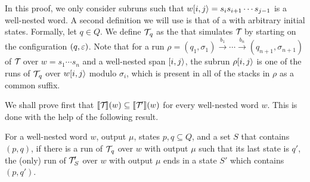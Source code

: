 	In this proof, we only consider subruns such that $w[i,j\rangle = s_{i}s_{i+1}\cdots s_{j-1}$ is a well-nested word. 
	A second definition we will use is that of a \vpann with arbitrary initial states. 
	Formally, let $q\in Q$. 
	We define $\mathcal{T}\!_{q}$ as the \vpann that simulates $\mathcal{T}\!$ by starting on the configuration $(q,\varepsilon)$. 
	Note that for a run $\rho = (q_1, \sigma_1) \xrightarrow{b_1} \cdots  \xrightarrow{b_n} (q_{n+1}, \sigma_{n+1})$ of $\mathcal{T}\!$ over $w = s_1\cdots s_n$ and a well-nested span $[i,j\rangle$, the subrun $\rho[i,j\rangle$ is one of the runs of $\mathcal{T}\!_{q}$ over $w[i,j\rangle$ modulo $\sigma_i$, which is present in all of the stacks in $\rho$ as a common suffix.
	
	We shall prove first that $\llbracket \mathcal{T}\! \rrbracket(w) \subseteq \llbracket \mathcal{T}\!' \rrbracket(w)$ for every well-nested word $w$. This is done with the help of the following result.
	
	\begin{claim}
		For a well-nested word $w$, output $\mu$, states $p,q\subseteq Q$, and a set $S$ that contains $(p,q)$, if there is a run of $\mathcal{T}\!_q$ over $w$ with output $\mu$ such that its last state is $q'$, the (only) run of $\mathcal{T}\!'_{S}$ over $w$ with output $\mu$ ends in a state $S'$ which contains $(p,q')$.
	\end{claim}
	
